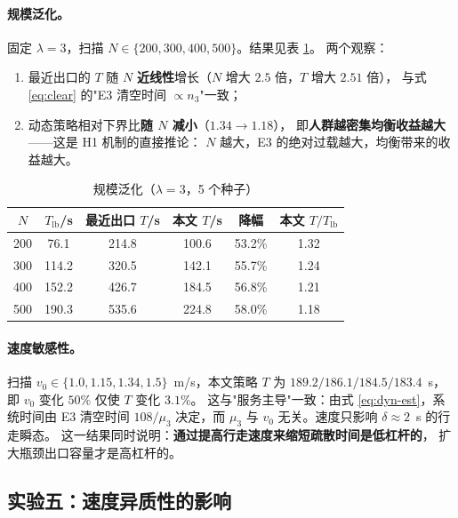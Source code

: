 \paragraph{规模泛化。}
固定 $\lambda=3$，扫描 $N\in\{200,300,400,500\}$。结果见表 \ref{tab:scale}。
两个观察：
\begin{enumerate}
  \item 最近出口的 $T$ 随 $N$ \textbf{近线性}增长（$N$ 增大 $2.5$ 倍，$T$ 增大 $2.51$ 倍），
        与式 \eqref{eq:clear} 的"E3 清空时间 $\propto n_3$"一致；
  \item 动态策略相对下界比\textbf{随 $N$ 减小}（$1.34\to1.18$），
        即\textbf{人群越密集均衡收益越大}——这是 H1 机制的直接推论：
        $N$ 越大，E3 的绝对过载越大，均衡带来的收益越大。
\end{enumerate}

\begin{table}[H]
  \centering
  \caption{规模泛化（$\lambda=3$，5 个种子）}
  \label{tab:scale}
  \begin{tabular}{cccccc}
    \toprule
    $N$ & $T_{\mathrm{lb}}$/s & 最近出口 $T$/s & 本文 $T$/s & 降幅 & 本文 $T/T_{\mathrm{lb}}$ \\
    \midrule
    200 & 76.1 & 214.8 & 100.6 & 53.2\% & 1.32 \\
    300 & 114.2 & 320.5 & 142.1 & 55.7\% & 1.24 \\
    400 & 152.2 & 426.7 & 184.5 & 56.8\% & 1.21 \\
    500 & 190.3 & 535.6 & 224.8 & 58.0\% & 1.18 \\
    \bottomrule
  \end{tabular}
\end{table}

\paragraph{速度敏感性。}
扫描 $v_0\in\{1.0,1.15,1.34,1.5\}$~m/s，本文策略 $T$ 为
$189.2/186.1/184.5/183.4$~s，即 $v_0$ 变化 $50\%$ 仅使 $T$ 变化 $3.1\%$。
这与"服务主导"一致：由式 \eqref{eq:dyn-est}，系统时间由 E3 清空时间
$108/\mu_3$ 决定，而 $\mu_3$ 与 $v_0$ 无关。速度只影响 $\delta\approx2$~s 的行走瞬态。
这一结果同时说明：\textbf{通过提高行走速度来缩短疏散时间是低杠杆的}，
扩大瓶颈出口容量才是高杠杆的。

\subsection{实验五：速度异质性的影响}
\label{sec:hetero}

